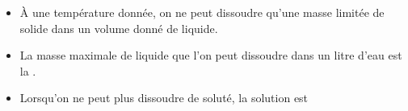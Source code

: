 \begin{mybilan}
	\begin{itemize}
		\item \`A une température donnée, on ne peut dissoudre qu'une masse limitée de solide dans un volume donné de liquide.\pause
		
		\item La masse maximale de liquide que l'on peut dissoudre dans un litre d'eau est la .\pause
		
		\item Lorsqu'on ne peut plus dissoudre de soluté, la solution est 
	\end{itemize}
	
\end{mybilan}